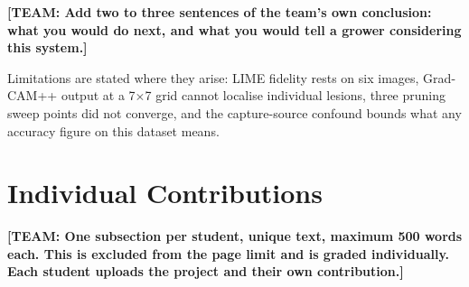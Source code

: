 \documentclass[sigconf,nonacm]{acmart}
\newcommand{\NEEDSTEAM}[1]{\textbf{[TEAM: #1]}}
\begin{document}
\NEEDSTEAM{Add two to three sentences of the team's own conclusion: what you
would do next, and what you would tell a grower considering this system.}

Limitations are stated where they arise: LIME fidelity rests on six images,
Grad-CAM++ output at a 7$\times$7 grid cannot localise individual lesions, three
pruning sweep points did not converge, and the capture-source confound bounds
what any accuracy figure on this dataset means.




\appendix
\section{Individual Contributions}
\NEEDSTEAM{One subsection per student, unique text, maximum 500 words each. This
is excluded from the page limit and is graded individually. Each student uploads
the project and their own contribution.}
\end{document}
